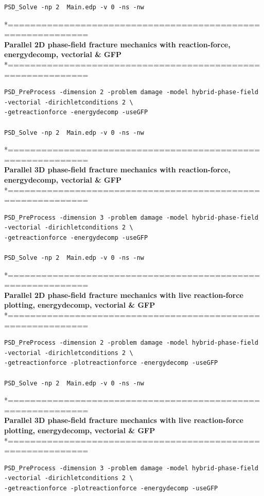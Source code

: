 {{\begin{lstlisting}[style=BashInputStyle]
PSD_Solve -np 2  Main.edp -v 0 -ns -nw   	
\end{lstlisting}
*============================================================\\
 \textbf{Parallel 2D phase-field fracture mechanics with reaction-force, energydecomp, vectorial \& GFP} \\
*============================================================\\
\begin{lstlisting}[style=BashInputStyle]
PSD_PreProcess -dimension 2 -problem damage -model hybrid-phase-field -vectorial -dirichletconditions 2 \
-getreactionforce -energydecomp -useGFP  

PSD_Solve -np 2  Main.edp -v 0 -ns -nw   
\end{lstlisting}
*============================================================\\
\textbf{ Parallel 3D phase-field fracture mechanics with reaction-force, energydecomp, vectorial \& GFP} \\
*============================================================\\
\begin{lstlisting}[style=BashInputStyle]
PSD_PreProcess -dimension 3 -problem damage -model hybrid-phase-field -vectorial -dirichletconditions 2 \
-getreactionforce -energydecomp -useGFP   

PSD_Solve -np 2  Main.edp -v 0 -ns -nw   	
\end{lstlisting}
*============================================================\\
 \textbf{Parallel 2D phase-field fracture mechanics with live reaction-force plotting, energydecomp, vectorial \& GFP} \\
*============================================================\\
\begin{lstlisting}[style=BashInputStyle]
PSD_PreProcess -dimension 2 -problem damage -model hybrid-phase-field -vectorial -dirichletconditions 2 \
-getreactionforce -plotreactionforce -energydecomp -useGFP  

PSD_Solve -np 2  Main.edp -v 0 -ns -nw   
\end{lstlisting}
*============================================================\\
\textbf{ Parallel 3D phase-field fracture mechanics with live reaction-force plotting, energydecomp, vectorial \& GFP} \\
*============================================================\\
\begin{lstlisting}[style=BashInputStyle]
PSD_PreProcess -dimension 3 -problem damage -model hybrid-phase-field -vectorial -dirichletconditions 2 \
-getreactionforce -plotreactionforce -energydecomp -useGFP   


\end{lstlisting}}}
